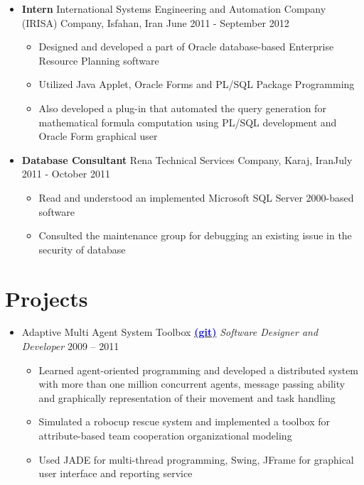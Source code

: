 \documentclass[letter]{res}
\begin{document}
\begin{resume}
\begin{itemize}[leftmargin=-.1in]
\item \textbf{Intern} \newline
International Systems Engineering and Automation Company (IRISA) Company, Isfahan, Iran \hfill June 2011 - September 2012\\
	\vspace{-4mm}
    \iflong
      \begin{itemize}
          \item Designed and developed a part of Oracle database-based Enterprise Resource Planning software
          \item Utilized Java Applet, Oracle Forms and PL/SQL Package Programming
          \item Also developed a plug-in that automated the query generation for mathematical formula computation using PL/SQL development and Oracle Form graphical user
      \end{itemize}
    \fi

\item \textbf{Database Consultant}
\newline
Rena Technical Services Company, Karaj, Iran\hfill July 2011 - October 2011\\
	\vspace{-4mm}
	\iflong
    \begin{itemize}
       \item Read and understood an implemented Microsoft SQL Server 2000-based software
       \item Consulted the maintenance group for debugging an existing issue in the security of database
    \end{itemize}
\end{itemize}


\section{Projects}
\begin{itemize}[leftmargin=-.1in]
\item Adaptive Multi Agent System Toolbox {\href{https://github.com/omid55/team_based_rescue_jade_multi_agent_system}{\textbf{\textcolor{blue}{(git)}}}} \newline
{\sl Software Designer and Developer} \hfill 2009 – 2011\\
  \vspace{-4mm}
  \iflong
    \begin{itemize}
    \item Learned agent-oriented programming and developed a distributed system with more than one million concurrent agents, message passing ability and graphically representation of their movement and task handling
    \item Simulated a robocup rescue system and implemented a toolbox for 				attribute-based team cooperation organizational modeling
    \item Used JADE for multi-thread programming, Swing, JFrame for graphical user interface and reporting service
    \end{itemize}
  \fi


\end{itemize}
\end{resume}
\end{document}
